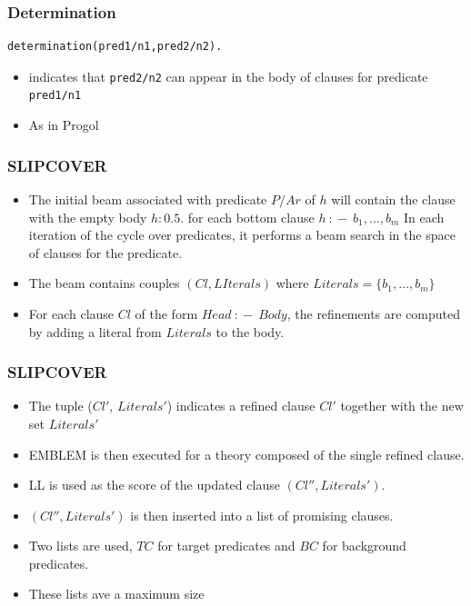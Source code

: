 \documentclass[trans,aspectratio=1610]{beamer}
\begin{document}
\begin{frame}[fragile]
\frametitle{Determination}
\begin{verbatim}
determination(pred1/n1,pred2/n2).
\end{verbatim}
\begin{itemize}
\item indicates that \verb|pred2/n2| can appear in the body of clauses for predicate \verb|pred1/n1|
\item As in Progol
\end{itemize}

\end{frame}


\begin{frame}
\frametitle{SLIPCOVER}

	\begin{itemize}

\item The initial beam associated with predicate $P/Ar$ of $h$ will contain the clause with the empty body $h:0.5.$ for each bottom clause $h\ {:\!-}\   b_1,\ldots,b_m$
In each iteration of the cycle over predicates, it performs a beam search in the space of clauses for the predicate.
\item The beam contains couples $(Cl, LIterals)$ where $Literals=\{b_1,\ldots,b_m\}$
\item
For each clause $Cl$ of the form $Head \ {:\!-}\ Body$, the  refinements are computed by adding a literal from $Literals$ to the body.
\end{itemize}
\end{frame}


\begin{frame}
\frametitle{SLIPCOVER}

	\begin{itemize}
\item The tuple ($Cl'$, $Literals'$) indicates a refined clause $Cl'$ together with the new set $Literals'$ \item EMBLEM is then executed for a theory  composed of the single refined clause.
\item  LL is used as the score of the updated clause $(Cl'',Literals')$.
\item $(Cl'',Literals')$ is then inserted into a list of promising clauses.
\item Two lists are used, $TC$ for target predicates and $BC$ for background predicates.
\item These lists ave a maximum size
\end{itemize}
\end{frame}
\end{document}
